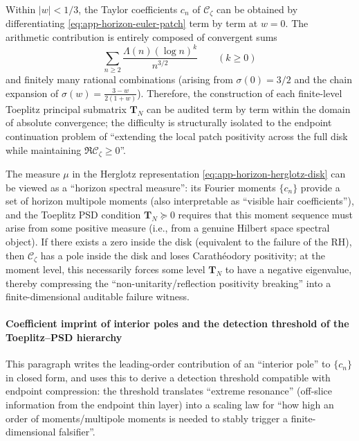 \begin{corollary}\label{cor:app-horizon-prime-moment-interface}
Within \(|w|<1/3\), the Taylor coefficients \(c_n\) of \(\mathscr{C}_{\zeta}\) can be obtained by differentiating \eqref{eq:app-horizon-euler-patch} term by term at \(w=0\).
The arithmetic contribution is entirely composed of convergent sums
\[
\sum_{n\ge2}\frac{\Lambda(n)(\log n)^k}{n^{3/2}}
\qquad(k\ge 0)
\]
and finitely many rational combinations (arising from \(\sigma(0)=3/2\) and the chain expansion of \(\sigma(w)=\frac{3-w}{2(1+w)}\)).
Therefore, the construction of each finite-level Toeplitz principal submatrix \(\mathbf{T}_N\) can be audited term by term within the domain of absolute convergence; the difficulty is structurally isolated to the endpoint continuation problem of ``extending the local patch positivity across the full disk while maintaining \(\Re\mathscr{C}_{\zeta}\ge 0\)''.
\end{corollary}

\begin{remark}\label{rem:app-horizon-multipole-positivity-hair}
The measure \(\mu\) in the Herglotz representation \eqref{eq:app-horizon-herglotz-disk} can be viewed as a ``horizon spectral measure'':
its Fourier moments \(\{c_n\}\) provide a set of horizon multipole moments (also interpretable as ``visible hair coefficients''), and the Toeplitz PSD condition \(\mathbf{T}_N\succeq 0\) requires that this moment sequence must arise from some positive measure (i.e., from a genuine Hilbert space spectral object).
If there exists a zero inside the disk (equivalent to the failure of the RH), then \(\mathscr{C}_{\zeta}\) has a pole inside the disk and loses Carath\'eodory positivity; at the moment level, this necessarily forces some level \(\mathbf{T}_N\) to have a negative eigenvalue, thereby compressing the ``non-unitarity/reflection positivity breaking'' into a finite-dimensional auditable failure witness.
\end{remark}
\paragraph{Coefficient imprint of interior poles and the detection threshold of the Toeplitz--PSD hierarchy}
This paragraph writes the leading-order contribution of an ``interior pole'' to \(\{c_n\}\) in closed form, and uses this to derive a detection threshold compatible with endpoint compression: the threshold translates ``extreme resonance'' (off-slice information from the endpoint thin layer) into a scaling law for ``how high an order of moments/multipole moments is needed to stably trigger a finite-dimensional falsifier''.

